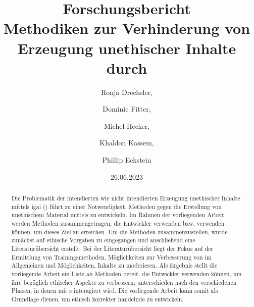 \documentclass[hidelinks,12pt]{report}
\title{Forschungsbericht \\[1ex] \large Methodiken zur Verhinderung von  Erzeugung unethischer Inhalte durch \GLSabrev{igai}}
\date{26.06.2023}
\author{Ronja Drechsler, \and Dominic Fitter, \and Michel Hecker, \and Khaldon Kassem, \and Phillip Eckstein}
\begin{document}
\maketitle

\begin{abstract}
	Die Problematik der intendierten wie nicht intendierten Erzeugung unethischer Inhalte mittels \Gls{igai} () führt zu einer Notwendigkeit, Methoden gegen die Erstellung von unethischem Material mittels  zu entwickeln. Im Rahmen der vorliegenden Arbeit werden Methoden zusammengetragen, die Entwickler verwenden bzw. verwenden können, um dieses Ziel zu erreichen. Um die Methoden zusammenzustellen, wurde zunächst auf ethische Vorgaben zu  eingegangen und anschließend eine Literaturübersicht erstellt. Bei der Literaturübersicht liegt der Fokus auf der Ermittlung von Trainingsmethoden, Möglichkeiten zur Verbesserung von  im Allgemeinen und Möglichkeiten, Inhalte zu moderieren. Als Ergebnis stellt die vorliegende Arbeit ein Liste an Methoden bereit, die Entwickler verwenden können, um ihre  bezüglich ethischer Aspekte zu verbessern; unterschieden nach den verschiedenen Phasen, in denen mit s interagiert wird. Die vorliegende Arbeit kann somit als Grundlage dienen, um ethisch korrekter handelnde  zu entwickeln.
\end{abstract}



\tableofcontents
\newpage
\printnoidxglossary[nonumberlist]
\newpage
\end{document}
